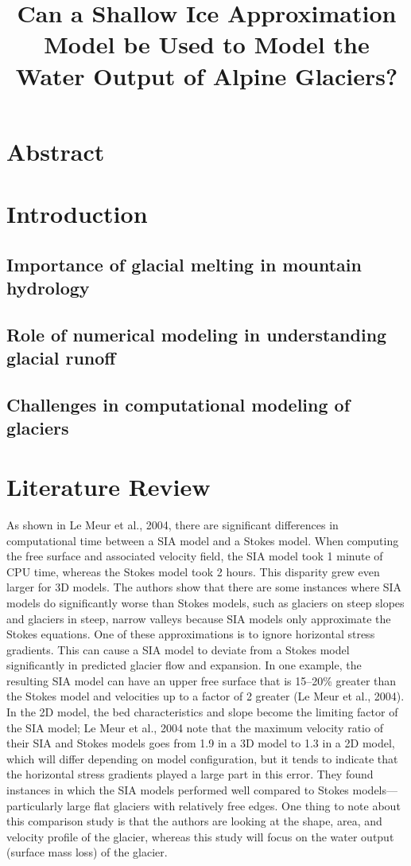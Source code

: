\documentclass{article}
\title{Can a Shallow Ice Approximation Model be Used to Model the Water Output of Alpine Glaciers?}
\author{}
\date{}
\begin{document}
\maketitle

\section*{Abstract}

\section{Introduction}
\subsection{Importance of glacial melting in mountain hydrology}
\subsection{Role of numerical modeling in understanding glacial runoff}
\subsection{Challenges in computational modeling of glaciers}

\section{Literature Review}
    As shown in Le Meur et al., 2004, there are significant differences in computational time between a SIA model and a Stokes model. When 
computing the free surface and associated velocity field, the SIA model took 1 minute of CPU time, whereas the Stokes model took 2 hours. 
This disparity grew even larger for 3D models. The authors show that there are some instances where SIA models do significantly worse than 
Stokes models, such as glaciers on steep slopes and glaciers in steep, narrow valleys because SIA models only approximate the Stokes 
equations. One of these approximations is to ignore horizontal stress gradients. This can cause a SIA model to deviate from a Stokes model 
significantly in predicted glacier flow and expansion. In one example, the resulting SIA model can have an upper free surface that is 
15--20\% greater than the Stokes model and velocities up to a factor of 2 greater (Le Meur et al., 2004). In the 2D model, the bed 
characteristics and slope become the limiting factor of the SIA model; Le Meur et al., 2004 note that the maximum velocity ratio of their 
SIA and Stokes models goes from 1.9 in a 3D model to 1.3 in a 2D model, which will differ depending on model configuration, but it tends to 
indicate that the horizontal stress gradients played a large part in this error. They found instances in which the SIA models performed well 
compared to Stokes models---particularly large flat glaciers with relatively free edges. One thing to note about this comparison study is 
that the authors are looking at the shape, area, and velocity profile of the glacier, whereas this study will focus on the water output 
(surface mass loss) of the glacier.
\end{document}
